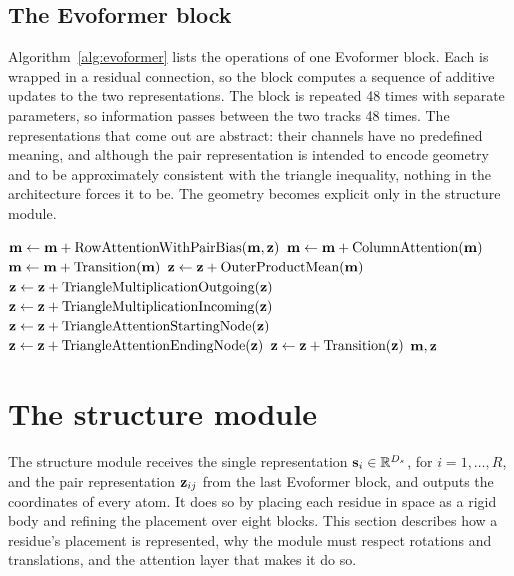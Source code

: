 \subsection{The Evoformer block}

Algorithm~\ref{alg:evoformer} lists the operations of one Evoformer block. Each is wrapped in a residual connection, so the block computes a sequence of additive updates to the two representations. The block is repeated 48 times with separate parameters, so information passes between the two tracks 48 times. The representations that come out are abstract: their channels have no predefined meaning, and although the pair representation is intended to encode geometry and to be approximately consistent with the triangle inequality, nothing in the architecture forces it to be. The geometry becomes explicit only in the structure module.

\begin{algorithm}[!htbp]
  \caption{One Evoformer block. Inputs are the MSA representation $\{\vm_{si}\}$ ($S\times R\times D_m$) and the pair representation $\{\vz_{ij}\}$ ($R\times R\times D_z$).}
  \label{alg:evoformer}
  \begin{algorithmic}[1]
    \State $\mathbf{m} \gets \mathbf{m} + \text{RowAttentionWithPairBias}(\mathbf{m},\mathbf{z})$ 
    \State $\mathbf{m} \gets \mathbf{m} + \text{ColumnAttention}(\mathbf{m})$
    \State $\mathbf{m} \gets \mathbf{m} + \text{Transition}(\mathbf{m})$ 
    \State $\mathbf{z} \gets \mathbf{z} + \text{OuterProductMean}(\mathbf{m})$ 
    \State $\mathbf{z} \gets \mathbf{z} + \text{TriangleMultiplicationOutgoing}(\mathbf{z})$ \Comment{\eqref{eq:tri_mult}}
    \State $\mathbf{z} \gets \mathbf{z} + \text{TriangleMultiplicationIncoming}(\mathbf{z})$
    \State $\mathbf{z} \gets \mathbf{z} + \text{TriangleAttentionStartingNode}(\mathbf{z})$ \Comment{\eqref{eq:tri_att}}
    \State $\mathbf{z} \gets \mathbf{z} + \text{TriangleAttentionEndingNode}(\mathbf{z})$
    \State $\mathbf{z} \gets \mathbf{z} + \text{Transition}(\mathbf{z})$
    \State \Return $\mathbf{m},\mathbf{z}$
  \end{algorithmic}
\end{algorithm}

\section{The structure module}
\label{sec:structure_module}

The structure module receives the single representation $\mathbf{s}_i\in\mathbb{R}^{D_s}$, for $i=1,\dots,R$, and the pair representation $\mathbf{z}_{ij}$ from the last Evoformer block, and outputs the coordinates of every atom. It does so by placing each residue in space as a rigid body and refining the placement over eight blocks. This section describes how a residue's placement is represented, why the module must respect rotations and translations, and the attention layer that makes it do so.

